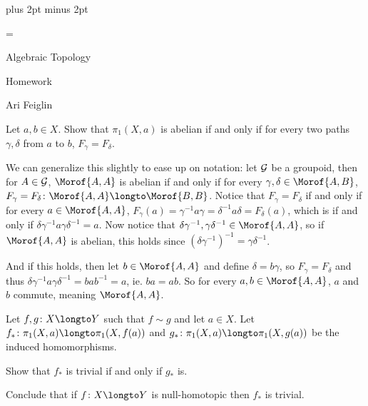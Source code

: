 

\parindent=0pt
\parskip=3pt plus 2pt minus 2pt



\footline={}

\setcounter{section}{3}


\def\printmcount{\the\counter{section}.\the\counter{math counter}}

{

    \centerline{Algebraic Topology}
    \smallskip
    \centerline{Homework \the{}}
    \centerline{Ari Feiglin}

\eppbox}

\bexerc

    Let $a,b\in X$.
    Show that $\pi_1(X,a)$ is abelian if and only if for every two paths $\gamma,\delta$ from $a$ to $b$, $F_\gamma=F_\delta$.

\eexerc

We can generalize this slightly to ease up on notation: let ${\cal G}$ be a groupoid, then for $A\in{\cal G}$, $\Morof{A,A}$ is abelian if and only if for every $\gamma,\delta\in\Morof{A,B}$,
$F_\gamma=F_\delta\colon\Morof{A,A}\longto\Morof{B,B}$.
Notice that $F_\gamma=F_\delta$ if and only if for every $a\in\Morof{A,A}$, $F_\gamma(a)=\gamma^{-1}a\gamma=\delta^{-1}a\delta=F_\delta(a)$, which is if and only if $\delta\gamma^{-1}a\gamma\delta^{-1}=a$.
Now notice that $\delta\gamma^{-1},\gamma\delta^{-1}\in\Morof{A,A}$, so if $\Morof{A,A}$ is abelian, this holds since $(\delta\gamma^{-1})^{-1}=\gamma\delta^{-1}$.

And if this holds, then let $b\in\Morof{A,A}$ and define $\delta=b\gamma$, so $F_\gamma=F_\delta$ and thus $\delta\gamma^{-1}a\gamma\delta^{-1}=bab^{-1}=a$, ie. $ba=ab$.
So for every $a,b\in\Morof{A,A}$, $a$ and $b$ commute, meaning $\Morof{A,A}$.

\bexerc

    Let $f,g\colon X\longto Y$ such that $f\sim g$ and let $a\in X$.
    Let $f_*\colon\pi_1(X,a)\longto\pi_1(X,f(a))$ and $g_*\colon\pi_1(X,a)\longto\pi_1(X,g(a))$ be the induced homomorphisms.
    \benum
        \item Show that $f_*$ is trivial if and only if $g_*$ is.
        \item Conclude that if $f\colon X\longto Y$ is null-homotopic then $f_*$ is trivial.
    \eenum

